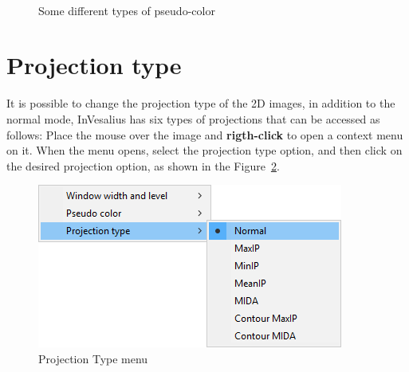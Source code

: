 \begin{figure}[h]
  \\
  \caption{Some different types of pseudo-color}
  \label{fig:pseudo_color_types}
\end{figure}

\newpage
\section{Projection type}

It is possible to change the projection type of the 2D images, in addition to the normal mode, InVesalius has six types of projections that can be accessed as follows: Place the mouse over the image and \textbf{rigth-click} to open a context menu on it. When the menu opens, select the projection type option, and then click on the desired projection option, as shown in the Figure~\ref{fig:menu_proj}.

\begin{figure}[!h]
\centering
\includegraphics[scale=0.40]{../user_guide_figures/invesalius_screen/menu_projection_en.png}
\caption{Projection Type menu}
\label{fig:menu_proj}
\end{figure}


